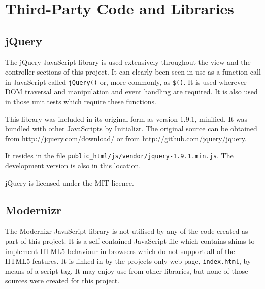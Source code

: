 \chapter{Third-Party Code and Libraries}




\section{jQuery}
The jQuery Java\-Script library is used extensively throughout the view and the controller sections of this project. It can clearly been seen in use as a function call in Java\-Script called \texttt{jQuery()} or, more commonly, as \texttt{\$()}. It is used wherever DOM traversal and manipulation and event handling are required. It is also used in those unit tests which require these functions.

This library was included in its original form as version 1.9.1, minified. It was bundled with other Java\-Scripts by Initializr. The original source can be obtained from \url{http://jquery.com/download/} or from \url{http://github.com/jquery/jquery}.

It resides in the file \verb|public_html/js/vendor/jquery-1.9.1.min.js|. The development version is also in this location.

jQuery is licensed under the MIT licence.

\section{Modernizr}
The Modernizr Java\-Script library is not utilised by any of the code created as part of this project. It is a self-contained Java\-Script file which contains shims to implement HTML5 behaviour in browsers which do not support all of the HTML5 features. It is linked in by the projects only web page, \texttt{index.html}, by means of a script tag. It may enjoy use from other libraries, but none of those sources were created for this project.

